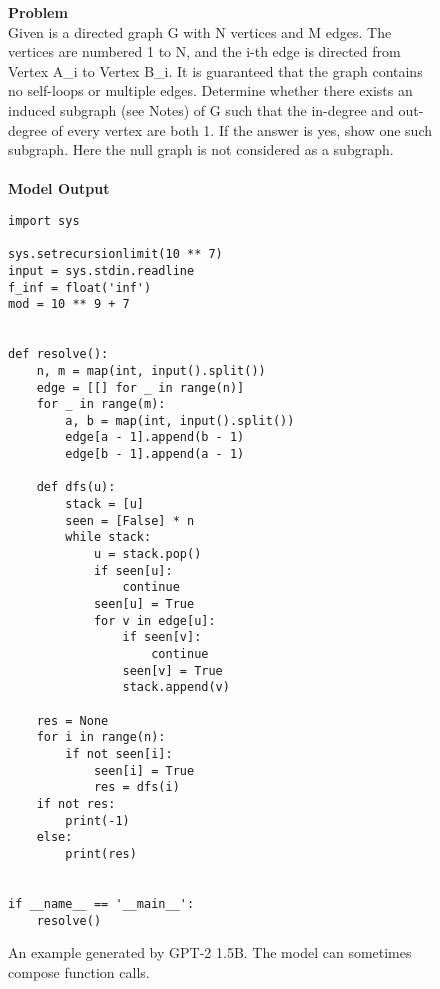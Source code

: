 \documentclass{article}
\begin{document}
\begin{figure*}
    \textbf{Problem} \\
    Given is a directed graph G with N vertices and M edges. The vertices are numbered 1 to N, and the i-th edge is directed from Vertex A\_i to Vertex B\_i. It is guaranteed that the graph contains no self-loops or multiple edges. Determine whether there exists an induced subgraph (see Notes) of G such that the in-degree and out-degree of every vertex are both 1. If the answer is yes, show one such subgraph. Here the null graph is not considered as a subgraph.
    \\
     \\
 \textbf{Model Output}
 \begin{small}
 \begin{verbatim}
import sys

sys.setrecursionlimit(10 ** 7)
input = sys.stdin.readline
f_inf = float('inf')
mod = 10 ** 9 + 7


def resolve():
    n, m = map(int, input().split())
    edge = [[] for _ in range(n)]
    for _ in range(m):
        a, b = map(int, input().split())
        edge[a - 1].append(b - 1)
        edge[b - 1].append(a - 1)

    def dfs(u):
        stack = [u]
        seen = [False] * n
        while stack:
            u = stack.pop()
            if seen[u]:
                continue
            seen[u] = True
            for v in edge[u]:
                if seen[v]:
                    continue
                seen[v] = True
                stack.append(v)

    res = None
    for i in range(n):
        if not seen[i]:
            seen[i] = True
            res = dfs(i)
    if not res:
        print(-1)
    else:
        print(res)


if __name__ == '__main__':
    resolve()
\end{verbatim}
\end{small}
    \caption{An example generated by GPT-2 1.5B. The model can sometimes compose function calls.}
    \label{fig:supp_sample_1}
\end{figure*}
\end{document}
